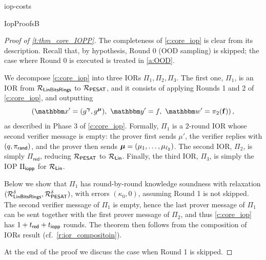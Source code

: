 \begin{lncsappendix}{iop-costs}
\begin{lncsmove}{IopProofsB}


\begin{proof}[Proof of \cref{t:thm_core_IOPP}] 
%
The completeness of \cref{c:core_iop} is clear from its description.  Recall that, by hypothesis, Round 0 (OOD sampling) is skipped; the case where Round 0 is executed is treated in \cref{a:OOD}. 

We decompose  \cref{c:core_iop} into three IORs $\Pi_1, \Pi_2, \Pi_3$.  The first one, $\Pi_1$, is an IOR from $\mathcal{R}_{\mathsf{LinBitsRings}}$ to $\mathcal{R}_{\mathsf{PESAT}}$, and it consists of applying Rounds 1 and 2 of \cref{c:core_iop}, and outputting $$\left(\inp'=(g^{\bm{\gamma}}, g^{\bm{\mu}}),\  \oracle'= f, \ \wit'=\picomfield(\bff)\right),$$ as described in Phase 3 of \cref{c:core_iop}. Formally, $\Pi_1$ is a $2$-round IOR whose second verifier message is empty: the prover first sends $\mu'$, the verifier replies with $(q,\pi_{\mathsf{rand}})$, and the prover then sends $\bm{\mu}=(\mu_1,\ldots, \mu_{\ell_2})$. The second IOR, $\Pi_2$, is simply $\Pi_{\mathsf{red}}$, reducing $\mathcal{R}_{\mathsf{PESAT}}$ to $\mathcal{R}_{\mathsf{Lin}}$. Finally, the third IOR, $\Pi_3$, is simply the IOP $\Pi_{\mathsf{iopp}}$ for $\mathcal{R}_{\mathsf{Lin}}$.


 Below we show that $\Pi_1$  has round-by-round knowledge soundness with relaxation $(\mathcal{R}_{\mathsf{LinBitsRings}}^{\delta}, \mathcal{R}_{\mathsf{PESAT}}^{\delta})$, with errors $(\kappa_0, 0)$, assuming Round 1 is not skipped. The second verifier message of $\Pi_1$ is empty, hence the last prover message of $\Pi_1$ can be sent together with the first prover message of $\Pi_2$, and thus  \cref{c:core_iop} has $1+t_{\mathsf{red}}+t_{\mathsf{iopp}}$ rounds. The theorem then follows from the composition of IORs result (cf.\ \cref{r:ior_compositoin}). 




 At the end of the proof we discuss the case when Round 1 is skipped. 




\end{proof}
\end{lncsmove}
\end{lncsappendix}
